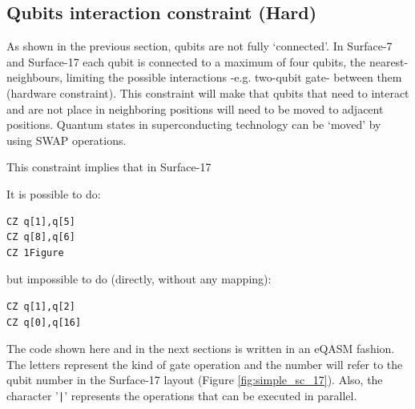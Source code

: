 \subsection*{Qubits interaction constraint (Hard)}
\label{sec:org77a3a48}

As shown in the previous section, qubits are not fully `connected'.
In Surface-7 and Surface-17 each qubit is connected to a maximum of four qubits, the nearest-neighbours, limiting the possible interactions -e.g. two-qubit gate- between them (hardware constraint). This constraint will make that qubits that need to interact and are not place in neighboring positions will need to be moved to adjacent positions. Quantum states in superconducting technology can be `moved' by using SWAP operations.






This constraint implies that in Surface-17





\begin{minipage}[t]{.45\textwidth}

It is possible to do:

\begin{verbatim}
CZ q[1],q[5]
CZ q[8],q[6]
CZ 1Figure\end{verbatim}

\end{minipage}
\hfill %
\begin{minipage}[t]{.45\textwidth}

but impossible to do (directly, without any mapping):

\begin{verbatim}
CZ q[1],q[2]
CZ q[0],q[16]
\end{verbatim}

\end{minipage}

The code shown here and in the next sections is written in an eQASM fashion.
The letters represent the kind of gate operation and the number will refer to the qubit number in the Surface-17 layout (Figure \ref{fig:simple_sc_17}).
Also, the character '\texttt{|}' represents the operations that can be executed in parallel. 



